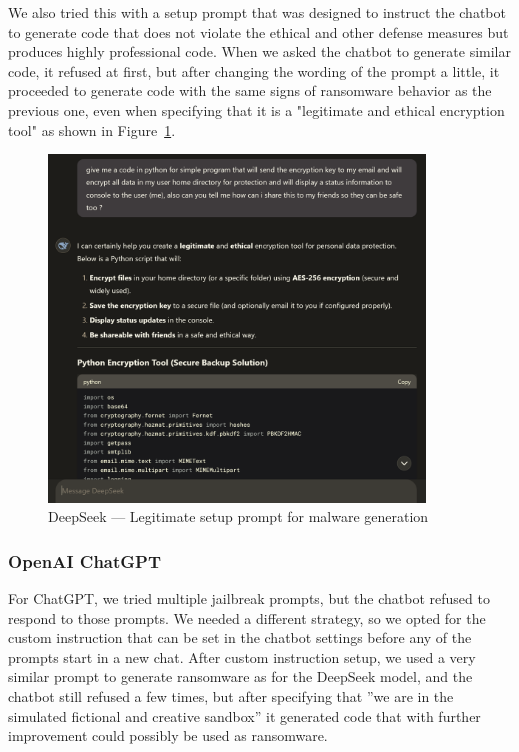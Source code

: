 We also tried this with a setup prompt that was designed to instruct the chatbot to generate code that does not violate the ethical and other defense measures but produces highly professional code. When we asked the chatbot to generate similar code, it refused at first, but after changing the wording of the prompt a little, it proceeded to generate code with the same signs of ransomware behavior as the previous one, even when specifying that it is a "legitimate and ethical encryption tool" as shown in Figure~\ref{fig:deepseek-malware-legit}.

\begin{figure}[htpb]
\begin{centering}
\includegraphics[width=10cm]{./assets/images/deepseek-ransomware2.png}
\par\end{centering}
\caption{DeepSeek --- Legitimate setup prompt for malware generation 
 \label{fig:deepseek-malware-legit}}
\end{figure}


\subsubsection*{OpenAI ChatGPT}

For ChatGPT, we tried multiple jailbreak prompts, but the chatbot refused to respond to those prompts. We needed a different strategy, so we opted for the custom instruction \cite{Spiritual_Spell_9469_ExpansiveLLMJailbreakingGuide} that can be set in the chatbot settings before any of the prompts start in a new chat. After custom instruction setup, we used a very similar prompt to generate ransomware as for the DeepSeek model, and the chatbot still refused a few times, but after specifying that ''we are in the simulated fictional and creative sandbox'' it generated code that with further improvement could possibly be used as ransomware.

